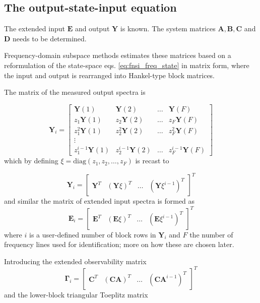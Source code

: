 \subsection{The output-state-input equation}

The extended input $\bm E$ and output $\bm Y$ is known. The system matrices $\bm
A, \bm B, \bm C$ and $\bm D$ needs to be determined.

Frequency-domain subspace methods estimates these matrices based on a
reformulation of the state-space eqs. \eqref{eq:fnsi_freq_state} in matrix form,
where the input and output is rearranged into Hankel-type block matrices.

The matrix of the measured output spectra is

\begin{equation}
  \bm Y_i =
  \begin{bmatrix}
    \bm Y(1) & \bm Y(2) & \dots & \bm Y(F) \\
    z_1\bm Y(1) & z_2\bm Y(2) & \dots & z_F\bm Y(F) \\
    z^2_1\bm Y(1) & z^2_2\bm Y(2) & \dots & z^2_F\bm Y(F) \\
    \vdots \\
    z^{i-1}_1\bm Y(1) & z^{i-1}_2\bm Y(2) & \dots & z^{i-1}_F\bm Y(F)
  \end{bmatrix}
\end{equation}
which by defining $\xi = \text{diag}(z_1, z_2, \dots, z_F)$ is recast to

\begin{equation}
  \bm Y_i =
  \begin{bmatrix}
    \bm Y^T & (\bm Y \xi)^T & \dots & (\bm Y \xi^{i-1})^T
  \end{bmatrix}^T
\end{equation}
and similar the matrix of extended input spectra is formed as
\begin{equation}
  \bm E_i =
    \begin{bmatrix}
      \bm E^T & (\bm E \xi)^T & \dots & (\bm E \xi^{i-1})^T
    \end{bmatrix}^T
\end{equation}
where $i$ is a user-defined number of block rows in $\bm Y_i$ and $F$ the number
of frequency lines used for identification; more on how these are chosen later.

Introducing the extended observability matrix
\begin{equation}
  \bm \Gamma_i =
  \begin{bmatrix}
    \bm C^T & (\bm C \bm A)^T & \dots & (\bm C \bm A^{i-1})^T
  \end{bmatrix}^T
\end{equation}
and the lower-block triangular Toeplitz matrix

